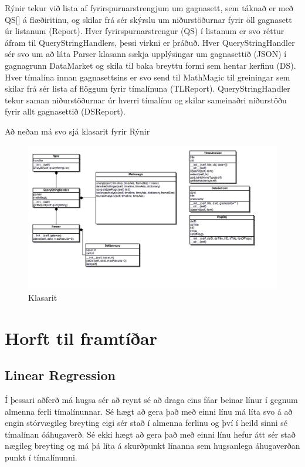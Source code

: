 \documentclass{article}
\begin{document}
Rýnir tekur við lista af fyrirspurnarstrengjum um gagnasett, sem táknað er með
QS[] á flæðiritinu, og skilar frá sér skýrslu um niðurstöðurnar fyrir öll
gagnasett úr listanum (Report). Hver fyrirspurnarstrengur (QS) í listanum er svo
réttur áfram til QueryStringHandlers, þessi virkni er þráðuð. Hver
QueryStringHandler sér svo um að láta Parser klasann sækja upplýsingar um
gagnasettið (JSON) í gagnagrunn DataMarket og skila til baka breyttu formi sem
hentar kerfinu (DS). Hver tímalína innan gagnasettsins er svo send til MathMagic
til greiningar sem skilar frá sér lista af flöggum fyrir tímalínuna (TLReport).
QueryStringHandler tekur saman niðurstöðurnar úr hverri tímalínu og skilar
sameinaðri niðurstöðu fyrir allt gagnasettið (DSReport).

Að neðan má svo sjá klasarit fyrir Rýnir

\begin{figure}[H]
  \centering
  \includegraphics[width=.75\textwidth]{rynir_class_diagram.png} 
  \caption{Klasarit} 
\end{figure}

\section{Horft til framtíðar}
\label{sec:future}

\subsection{Linear Regression}
Í þessari aðferð má hugsa sér að reynt sé að draga eins fáar beinar línur í
gegnum almenna ferli tímalínunnar. Sé hægt að gera það með einni línu má líta
svo á að engin stórvægileg breyting eigi sér stað í almenna ferlinu og því í
heild sinni sé tímalínan óáhugaverð. Sé ekki hægt að gera það með einni línu
hefur átt sér stað nægileg breyting og má þá líta á skurðpunkt línanna sem
hugsanlega áhugaverðan punkt í tímalínunni.
\end{document}
